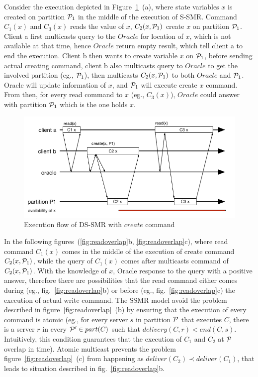 Consider the execution depicted in Figure~\ref{fig:read}~(a), where state variables $x$ is created on partition $\mathcal{P}_1$ in the middle of the execution of S-SMR. Command $C_1(x)$ and $C_3(x)$ reads the value of $x$, $C_2(x,\mathcal{P}_1)$ create $x$ on partition $\mathcal{P}_1$. Client a first multicasts query to the $Oracle$ for location of $x$, which is not available at that time, hence $Oracle$ return empty result, which tell client a to end the execution. Client b then wants to create variable $x$ on $\mathcal{P}_1$, before sending actual creating command, client b also multicasts query to $Oracle$ to get the involved partition (eg., $\mathcal{P}_1$), then multicasts $C_2(x,\mathcal{P}_1)$ to both $Oracle$ and $\mathcal{P}_1$. Oracle will update information of $x$, and $\mathcal{P}_1$ will execute create $x$ command. From then, for every read command to $x$ (eg., $C_3(x)$), $Oracle$ could answer with partition $\mathcal{P}_1$ which is the one holds $x$.

\begin{figure}
\begin{minipage}[b]{1.0\linewidth} %
\centering
      \includegraphics[width=0.6\linewidth]{figures/read_simple}
\end{minipage}
\centering
	\caption{Execution flow of DS-SMR with $create$ command}
\label{fig:read}
\end{figure}

In the following figures~(\ref{fig:readoverlap}b, \ref{fig:readoverlap}c), where read command $C_1(x)$ comes in the middle of the execution of create command $C_2(x,\mathcal{P}_1)$, while the query of $C_1(x)$ comes after multicasts command of $C_2(x,\mathcal{P}_1)$. With the knowledge of $x$, Oracle response to the query with a positive answer, therefore there are possibilities that the read command either comes during (eg., fig.~\ref{fig:readoverlap}b) or before (eg., fig.~\ref{fig:readoverlap}c) the execution of actual write command. The SSMR model avoid the problem described in figure~\ref{fig:readoverlap}~(b) by ensuring that the execution of every command is atomic (eg., for every server $s$ in partition $\mathcal{P}$ that executes $C$, there is a server $r$ in every $\mathcal{P}' \in part(C)$ such that $delivery(C,r) < end(C,s)$. Intuitively, this condition guarantees that the execution of $C_1$ and $C_2$ at $\mathcal{P}$ overlap in time). Atomic multicast prevents the problem figure~\ref{fig:readoverlap}~(c) from happening as $deliver(C_2) \prec deliver(C_1)$, that leads to situation described in fig.~\ref{fig:readoverlap}b.

